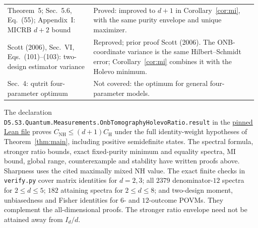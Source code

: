 \documentclass[11pt]{article}
\newcommand{\Id}{I}
\newcommand{\CH}{C_{\mathrm H}}
\newcommand{\CN}{C_{\mathrm{NH}}}
\begin{document}
\begin{center}
\begin{tabular}{@{}p{.43\linewidth}p{.51\linewidth}@{}}
Theorem~5; Sec.~5.6, Eq.~(55); Appendix~I: MICRB $d+2$ bound
& Proved: improved to $d+1$ in Corollary~\ref{cor:mi}, with the same purity envelope and unique maximizer.\\[3pt]
Scott (2006), Sec.~VI, Eqs.~(101)--(103): two-design estimator variance
& Reproved; prior proof Scott (2006). The ONB-coordinate variance is the same Hilbert--Schmidt error; Corollary~\ref{cor:mi} combines it with the Holevo minimum.\\[3pt]
Sec.~4: qutrit four-parameter optimum
& Not covered: the optimum for general four-parameter models.\\
\bottomrule
\end{tabular}
\end{center}

The declaration
\texttt{D5.S3.Quantum.Measurements.}\allowbreak\texttt{OnbTomographyHolevoRatio.result}
in the \href{https://github.com/the-omega-institute/trureturing/blob/3d88df0f99ef3c8bfb034fa52be669b13746a844/D5/S3/Quantum/Measurements/OnbTomographyHolevoRatio.lean}{pinned Lean file}
proves $\CN\leq(d+1)\CH$ under the full identity-weight hypotheses of
Theorem~\ref{thm:main}, including positive semidefinite states.
The spectral formula, stronger ratio bounds, exact fixed-purity minimum
and equality spectra, MI bound, global range, counterexample and stability
have written proofs above. Sharpness uses the cited maximally mixed NH value.
The exact finite checks in \texttt{verify.py} cover matrix identities for
$d=2,3$; all $2379$ denominator-$12$ spectra for $2\leq d\leq5$;
$182$ attaining spectra for $2\leq d\leq8$; and two-design moment,
unbiasedness and Fisher identities for $6$- and $12$-outcome POVMs.
They complement the all-dimensional proofs. The stronger ratio envelope
need not be attained away from $\Id_d/d$.
\end{document}
